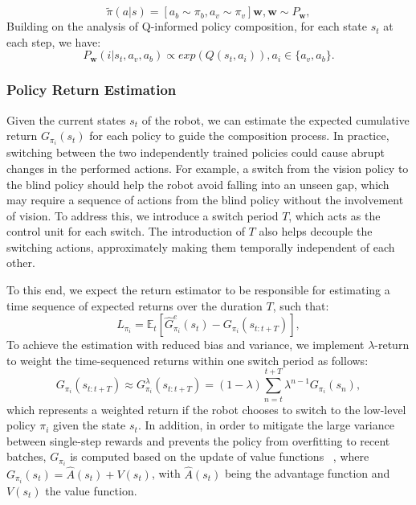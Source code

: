 \begin{equation}
    \tilde{\pi}(a|s) = [a_b \sim \pi_b, a_v \sim \pi_v ]\textbf{w}, \textbf{w} \sim P_\textbf{w},
\end{equation}
Building on the analysis of Q-informed policy composition, for each state $s_t$ at each step, we have:
\begin{equation}
    P_\textbf{w}(i|s_t,a_v,a_b) \propto exp(Q(s_t,a_i)), a_i \in \{a_v,a_b\} \label{propto}.
\end{equation}

\subsubsection{Policy Return Estimation}
Given the current states $s_t$ of the robot, we can estimate the expected cumulative return $G_{\pi_i}(s_t)$ for each policy to guide the composition process. In practice, switching between the two independently trained policies could cause abrupt changes in the performed actions. For example, a switch from the vision policy to the blind policy should help the robot avoid falling into an unseen gap, which may require a sequence of actions from the blind policy without the involvement of vision. To address this, we introduce a switch period $T$, which acts as the control unit for each switch. The introduction of $T$ also helps decouple the switching actions, approximately making them temporally independent of each other.

To this end, we expect the return estimator to be responsible for estimating a time sequence of expected returns over the duration $T$, such that:
\begin{equation}
    L_{\pi_i} = \mathbb{E}_t[\hat{G}_{\pi_i}^e(s_t) - G_{\pi_i}(s_{t:{t+T}})],
\end{equation}
To achieve the estimation with reduced bias and variance, we implement $\lambda$-return to weight the time-sequenced returns within one switch period as follows:
\begin{equation}
    G_{\pi_i}(s_{t:{t+T}}) \approx G^\lambda_{\pi_i}(s_{t:{t+T}}) = (1-\lambda)\sum_{n=t}^{t+T}\lambda^{n-1}G_{\pi_i}(s_{n}),
\end{equation}
which represents a weighted return if the robot chooses to switch to the low-level policy $\pi_i$ given the state $s_t$. In addition, in order to mitigate the large variance between single-step rewards and prevents the policy from overfitting to recent batches, $G_{\pi_i}$ is computed based on the update of value functions ~\cite{schulman2015high}, where $G_{\pi_i}(s_t) = \hat{A}(s_t) + V(s_t)$, with $\hat{A}(s_t)$ being the advantage function and $V(s_t)$ the value function.

